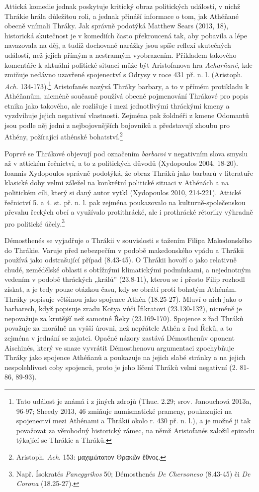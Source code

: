 Attická komedie jednak poskytuje kritický obraz politických událostí, v nichž Thrákie hrála důležitou roli, a jednak přináší informace o tom, jak Athéňané obecně vnímali Thráky. Jak správně podotýká Matthew Sears (2013, 18), historická skutečnost je v komediích často překroucená tak, aby pobavila a lépe navazovala na děj, a tudíž dochované narážky jsou spíše reflexí skutečných událostí, než jejich přímým a nestranným vyobrazením. Příkladem takového komentáře k aktuální politické situaci může být Aristofanova hra {\em Acharňané}, kde zmiňuje nedávno uzavřené spojenectví s Odrysy v roce 431 př. n. l. (Aristoph. {\em Ach.} 134-173).\footnote{Tato událost je známá i z jiných zdrojů (Thuc. 2.29; srov. Janouchová 2013a, 96-97; Sheedy 2013, 46 zmiňuje numismatické prameny, poukazující na spojenectví mezi Athénami a Thrákií okolo r. 430 př. n. l.), a je možné ji tak považovat za věrohodný historický rámec, na němž Aristofanés založil epizodu týkající se Thrákie a Thráků.} Aristofanés nazývá Thráky barbary, a to v přímém protikladu k Athéňanům, nicméně současně používá obecné pojmenování Thrákové pro popis etnika jako takového, ale rozlišuje i mezi jednotlivými thráckými kmeny a vyzdvihuje jejich negativní vlastnosti. Zejména pak žoldnéři z kmene Odomantů jsou podle něj jedni z nejbojovnějších bojovníků a představují zhoubu pro Athény, požírající athénské bohatství.\footnote{Aristoph. {\em Ach}. 153: μαχιμώτατον Θρᾳκῶν ἔθνος.}

Poprvé se Thrákové objevují pod označením {\em barbaroi} v negativním slova smyslu až v attickém řečnictví, a to z politických důvodů (Xydopoulos 2004, 18-20). Ioannis Xydopoulos správně podotýká, že obraz Thráků jako barbarů v literatuře klasické doby velmi záležel na konkrétní politické situaci v Athénách a na politickém cíli, který si daný autor vytkl (Xydopoulos 2010, 214-221). Attické řečnictví 5. a 4. st. př. n. l. pak zejména poukazovalo na kulturně-společenskou převahu řeckých obcí a využívalo protithrácké, ale i prothrácké rétoriky výhradně pro politické účely.\footnote{Např. Ísokratés {\em Panegyrikos} 50; Démosthenés {\em De Chersoneso} (8.43-45) či {\em De Corona} (18.25-27).}

Démosthenés se vyjadřuje o Thrákii v souvislosti s tažením Filipa Makedonského do Thrákie. Varuje před nebezpečím v podobě makedonského vpádu a Thrákii používá jako odstrašující případ (8.43-45). O Thrákii hovoří o jako relativně chudé, zemědělské oblasti s obtížnými klimatickými podmínkami, a nejednotným vedením v podobě thráckých „králů” (23.8-11), kterou se i přesto Filip rozhodl získat, a je tedy pouze otázkou času, kdy se obrátí proti bohatým Athénám. Thráky popisuje většinou jako spojence Athén (18.25-27). Mluví o nich jako o barbarech, když popisuje zradu Kotya vůči Ífikratovi (23.130-132), nicméně je nepovažuje za krutější než samotné Řeky (23.169-170). Spojence z řad Thráků považuje za morálně na vyšší úrovni, než nepřátele Athén z řad Řeků, a to zejména v jednání se zajatci. Opačné názory zastává Démosthenův oponent Aischinés, který ve snaze vyvrátit Démosthenovu argumentaci zpochybňuje Thráky jako spojence Athéňanů a poukazuje na jejich slabé stránky a na jejich nespolehlivost coby spojenců, proto je jeho líčení Thráků velmi negativní (2. 81-86, 89-93).

